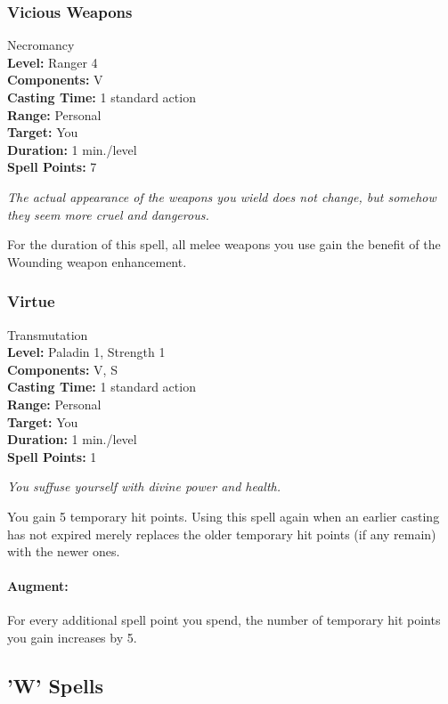 \subsubsection{Vicious Weapons}
\label{Spell:ViciousWeapons}
Necromancy
\\ \textbf{Level:} Ranger 4
\\ \textbf{Components:} V
\\ \textbf{Casting Time:} 1 standard action
\\ \textbf{Range:} Personal
\\ \textbf{Target:} You
\\ \textbf{Duration:} 1 min./level
\\ \textbf{Spell Points:} 7

\emph{The actual appearance of the weapons you wield does not change, but somehow they seem more cruel and dangerous.}

For the duration of this spell, all melee weapons you use gain the benefit of the Wounding weapon enhancement.
\subsubsection{Virtue}
\label{Spell:Virtue}
Transmutation
\\ \textbf{Level:} Paladin 1, Strength 1
\\ \textbf{Components:} V, S
\\ \textbf{Casting Time:} 1 standard action
\\ \textbf{Range:} Personal
\\ \textbf{Target:} You
\\ \textbf{Duration:} 1 min./level
\\ \textbf{Spell Points:} 1

\emph{You suffuse yourself with divine power and health.}

You gain 5 temporary hit points.
Using this spell again when an earlier casting has not expired merely replaces the older temporary hit points (if any remain) with the newer ones.

\paragraph{Augment:} For every additional spell point you spend, the number of temporary hit points you gain increases by 5.
\subsection{'W' Spells}
